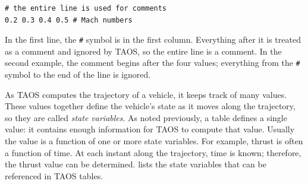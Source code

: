 \begin{lstlisting}[style=taosmanual]
# the entire line is used for comments
0.2 0.3 0.4 0.5 # Mach numbers
\end{lstlisting}

In the first line, the \texttt{\#} symbol is in the first column. Everything after it is
treated as a comment and ignored by TAOS, so the entire line is a comment. In the
second example, the comment begins after the four values; everything from the
\texttt{\#} symbol to the end of the line is ignored.


As TAOS computes the trajectory of a vehicle, it keeps track of many values. These
values together define the vehicle's state as it moves along the trajectory, so they are
called \emph{state variables}. As noted previously, a table defines a single value: it
contains enough information for TAOS to compute that value. Usually the value is a
function of one or more state variables. For example, thrust is often a function of
time. At each instant along the trajectory, time is known; therefore, the thrust value
can be determined.  lists the state variables that can be
referenced in TAOS tables.

